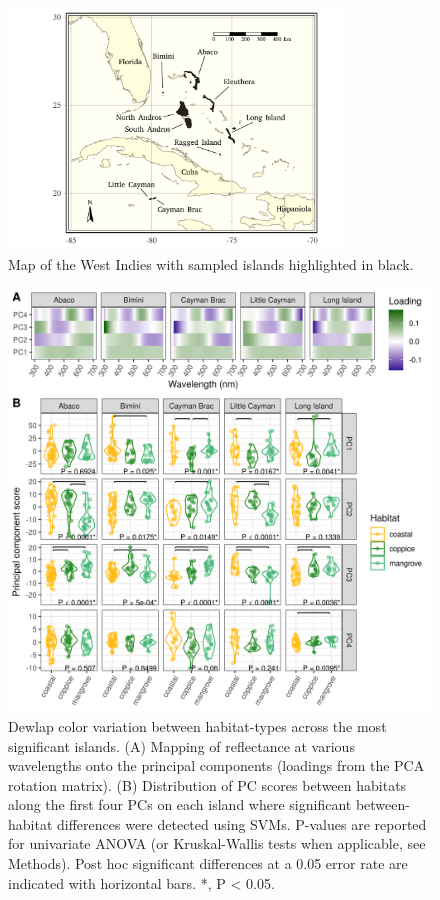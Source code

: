 \begin{figure}[H]
    \centering
	\includegraphics[width=0.8\textwidth]{../maps/map.pdf}
	\caption{Map of the West Indies with sampled islands highlighted in black.}
	\label{fig:map}
\end{figure}

\begin{figure}
	\centering
	\includegraphics[width=18cm]{../analyses/07-ANOVA/figure_anova.png}
	\caption{Dewlap color variation between habitat-types across the most significant islands. (A) Mapping of reflectance at various wavelengths onto the principal components (loadings from the PCA rotation matrix). (B) Distribution of PC scores between habitats along the first four PCs on each island where significant between-habitat differences were detected using SVMs. P-values are reported for univariate ANOVA (or Kruskal-Wallis tests when applicable, see Methods). Post hoc significant differences at a 0.05 error rate are indicated with horizontal bars. *, P < 0.05.}
	\label{fig:anova}
\end{figure}

